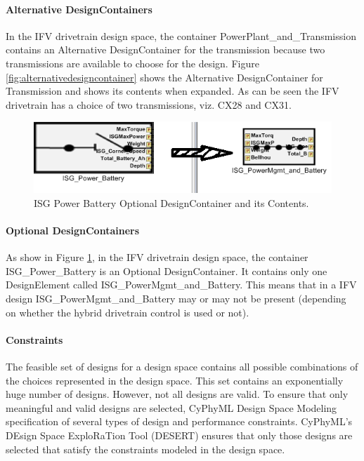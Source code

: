 \paragraph{Alternative DesignContainers}

In the IFV drivetrain design space, the container PowerPlant\_and\_Transmission contains an Alternative DesignContainer for the transmission because two transmissions are available to choose for the design. Figure \ref{fig:alternativedesigncontainer} shows the Alternative DesignContainer for Transmission and shows its contents when expanded. As can be seen the IFV drivetrain has a choice of two transmissions, viz. CX28 and CX31.

\begin{figure}[t]
\centering
\includegraphics[scale=0.50]{Figures/OptionalDesignContainer.png}
\caption{ISG Power Battery Optional DesignContainer and its Contents.}
\label{fig:optionaldesigncontainer}
\end{figure}

\paragraph{Optional DesignContainers}

As show in Figure \ref{fig:optionaldesigncontainer}, in the IFV drivetrain design space, the container ISG\_Power\_Battery is an Optional DesignContainer. It contains only one DesignElement called ISG\_PowerMgmt\_and\_Battery. This means that in a IFV design ISG\_PowerMgmt\_and\_Battery may or may not be present (depending on whether the hybrid drivetrain control is used or not).

\paragraph{Constraints}
The feasible set of designs for a design space contains all possible combinations of the choices represented in the design space. This set contains an exponentially huge number of designs. However, not all designs are valid. To ensure that only meaningful and valid designs are selected, CyPhyML Design Space Modeling specification of several types of design and performance constraints. CyPhyML's DEsign Space ExploRaTion Tool (DESERT) ensures that only those designs are selected that satisfy the constraints modeled in the design space.

